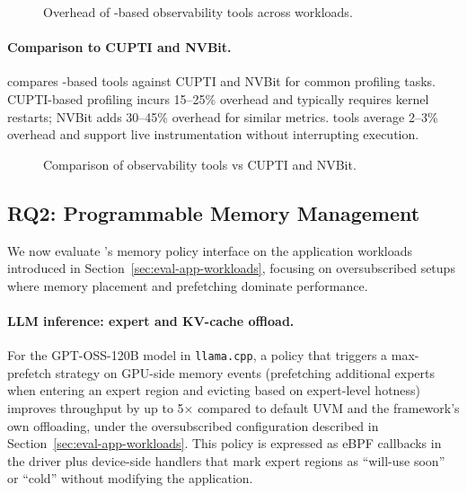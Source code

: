 \begin{figure}
\centering
{}
\caption{Overhead of \sys-based observability tools across workloads.}
\label{fig:obs-overhead}
\end{figure}

\paragraph{Comparison to CUPTI and NVBit.}
 compares \sys-based tools against CUPTI and
NVBit for common profiling tasks. CUPTI-based profiling incurs 15--25\%
overhead and typically requires kernel restarts; NVBit adds 30--45\%
overhead for similar metrics. \sys tools average 2--3\% overhead and support
live instrumentation without interrupting execution.

\begin{figure}
\centering
{}
\caption{Comparison of \sys observability tools vs CUPTI and NVBit.}
\label{fig:obs-comparison}
\end{figure}

\subsection{RQ2: Programmable Memory Management}

We now evaluate \sys's memory policy interface on the application workloads
introduced in Section~\ref{sec:eval-app-workloads}, focusing on oversubscribed
setups where memory placement and prefetching dominate performance.

\paragraph{LLM inference: expert and KV-cache offload.}
For the GPT-OSS-120B model in \texttt{llama.cpp}, a \sys policy that triggers a
max-prefetch strategy on GPU-side memory events (prefetching additional experts
when entering an expert region and evicting based on expert-level hotness)
improves throughput by up to 5$\times$ compared to default UVM and the
framework's own offloading, under the oversubscribed configuration described in
Section~\ref{sec:eval-app-workloads}. This policy is expressed as eBPF callbacks
in the driver plus device-side handlers that mark expert regions as
``will-use soon'' or ``cold'' without modifying the application.

